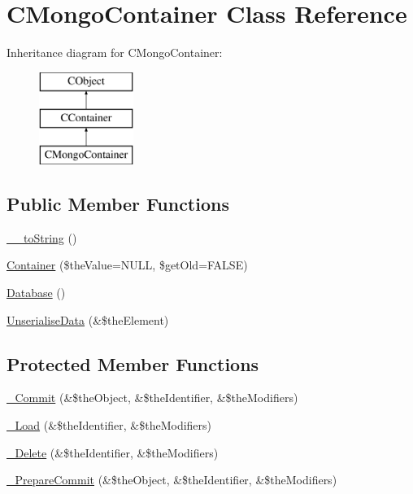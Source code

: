 \hypertarget{class_c_mongo_container}{\section{C\-Mongo\-Container Class Reference}
\label{class_c_mongo_container}
}
Inheritance diagram for C\-Mongo\-Container\-:\begin{figure}[H]
\begin{center}
\leavevmode
\includegraphics[height=3.000000cm]{class_c_mongo_container}
\end{center}
\end{figure}
\subsection*{Public Member Functions}
\begin{DoxyCompactItemize}
\item 
\hyperlink{class_c_mongo_container_abc325eae251667da577efdb45a7d3c17}{\-\_\-\-\_\-to\-String} ()
\item 
\hyperlink{class_c_mongo_container_a253978bb8e4d1e2613665d308de83e1e}{Container} (\$the\-Value=N\-U\-L\-L, \$get\-Old=F\-A\-L\-S\-E)
\item 
\hyperlink{class_c_mongo_container_a27a99b6ea891b226729bc6cb8426cac0}{Database} ()
\item 
\hyperlink{class_c_mongo_container_a077bdbf148dfa01f3798015906e4e70a}{Unserialise\-Data} (\&\$the\-Element)
\end{DoxyCompactItemize}
\subsection*{Protected Member Functions}
\begin{DoxyCompactItemize}
\item 
\hyperlink{class_c_mongo_container_a92cbcdba4f2b0bda2ae3eeb7a08d7ba2}{\-\_\-\-Commit} (\&\$the\-Object, \&\$the\-Identifier, \&\$the\-Modifiers)
\item 
\hyperlink{class_c_mongo_container_a61f469d1975834b22665392542620317}{\-\_\-\-Load} (\&\$the\-Identifier, \&\$the\-Modifiers)
\item 
\hyperlink{class_c_mongo_container_aa516a049efe0c9083e2f8c5b9f9076a4}{\-\_\-\-Delete} (\&\$the\-Identifier, \&\$the\-Modifiers)
\item 
\hyperlink{class_c_mongo_container_af592e4500a640190f374c18683af3b83}{\-\_\-\-Prepare\-Commit} (\&\$the\-Object, \&\$the\-Identifier, \&\$the\-Modifiers)
\end{DoxyCompactItemize}
